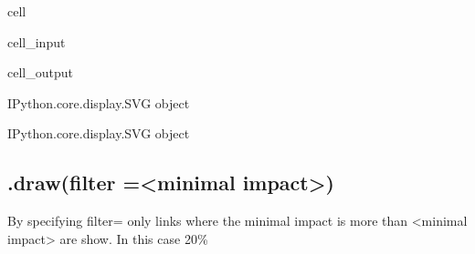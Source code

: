 \documentclass[letterpaper,10pt,english]{jupyterBook}
\begin{document}
\begin{sphinxuseclass}{cell}\begin{sphinxVerbatimInput}

\begin{sphinxuseclass}{cell_input}
\begin{sphinxVerbatim}[commandchars=\\\{\}]
\PYG{p}{[}\PYG{p}{]}  
\end{sphinxVerbatim}

\end{sphinxuseclass}\end{sphinxVerbatimInput}
\begin{sphinxVerbatimOutput}

\begin{sphinxuseclass}{cell_output}
\begin{sphinxVerbatim}[commandchars=\\\{\}]
\PYGZlt{}IPython.core.display.SVG object\PYGZgt{}
\end{sphinxVerbatim}

\begin{sphinxVerbatim}[commandchars=\\\{\}]
\PYGZlt{}IPython.core.display.SVG object\PYGZgt{}
\end{sphinxVerbatim}

\end{sphinxuseclass}\end{sphinxVerbatimOutput}

\end{sphinxuseclass}

\subsection{.draw(filter =<minimal impact>)}
\label{\detokenize{content/notebooks/modelflow_features:draw-filter-minimal-impact}}
\sphinxAtStartPar
By specifying filter=  only links where the minimal impact is more than <minimal impact> are show. In this case 20\%
\end{document}
